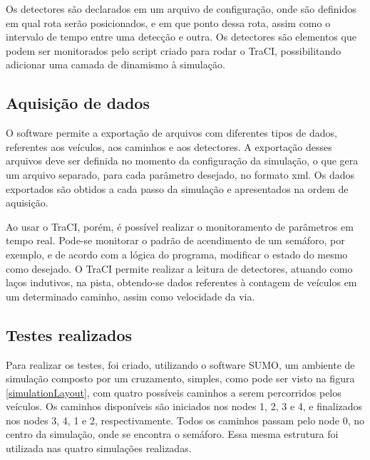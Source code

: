 Os detectores são declarados em um arquivo de configuração, onde são definidos em qual rota serão posicionados, e em que ponto dessa rota, assim como o intervalo de tempo entre uma detecção e outra. Os detectores são elementos que podem ser monitorados pelo script criado para rodar o TraCI, possibilitando adicionar uma camada de dinamismo à simulação.

\subsection{Aquisição de dados}

O software permite a exportação de arquivos com diferentes tipos de dados, referentes aos veículos, aos caminhos e aos detectores. A exportação desses arquivos deve ser definida no momento da configuração da simulação, o que gera um arquivo separado, para cada parâmetro desejado, no formato xml. Os dados exportados são obtidos a cada passo da simulação e apresentados na ordem de aquisição.

Ao usar o TraCI, porém, é possível realizar o monitoramento de parâmetros em tempo real. Pode-se monitorar o padrão de acendimento de um semáforo, por exemplo, e de acordo com a lógica do programa, modificar o estado do mesmo como desejado. O TraCI permite realizar a leitura de detectores, atuando como laços indutivos, na pista, obtendo-se dados referentes à contagem de veículos em um determinado caminho, assim como velocidade da via.

\subsection{Testes realizados}

Para realizar os testes, foi criado, utilizando o software SUMO, um ambiente de simulação composto por um cruzamento, simples, como pode ser visto na figura \ref{simulationLayout}, com quatro possíveis caminhos a serem percorridos pelos veículos. Os caminhos disponíveis são iniciados nos nodes 1, 2, 3 e 4, e finalizados nos nodes 3, 4, 1 e 2, respectivamente. 
Todos os caminhos passam pelo node 0, no centro da simulação, onde se encontra o semáforo. Essa mesma estrutura foi utilizada nas quatro simulações realizadas.

